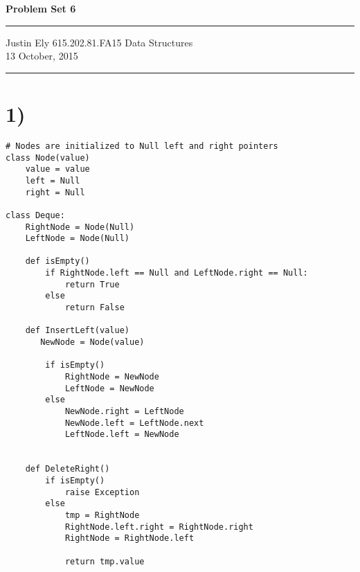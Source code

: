 \documentclass[a4paper,11pt]{article}
\begin{document}
\begin{flushright}

\vspace{1.1cm}

{\bf\Huge Problem Set 6}

\rule{0.25\linewidth}{0.5pt}

\vspace{0.5cm}
Justin Ely
\linebreak
\newline
\footnotesize{615.202.81.FA15 Data Structures \\}
\vspace{0.5cm}
13 October, 2015
\end{flushright}

\noindent\rule{\linewidth}{1.0pt}


\section*{1)}

\begin{verbatim}
# Nodes are initialized to Null left and right pointers
class Node(value)
    value = value
    left = Null
    right = Null

class Deque:
    RightNode = Node(Null)
    LeftNode = Node(Null)

    def isEmpty()
        if RightNode.left == Null and LeftNode.right == Null:
            return True
        else
            return False

    def InsertLeft(value)
       NewNode = Node(value)
       
        if isEmpty()
            RightNode = NewNode
            LeftNode = NewNode
        else
            NewNode.right = LeftNode
            NewNode.left = LeftNode.next            
            LeftNode.left = NewNode

        
    def DeleteRight()
        if isEmpty()
            raise Exception
        else
            tmp = RightNode
            RightNode.left.right = RightNode.right
            RightNode = RightNode.left
            
            return tmp.value
            
\end{verbatim}

\end{document}
